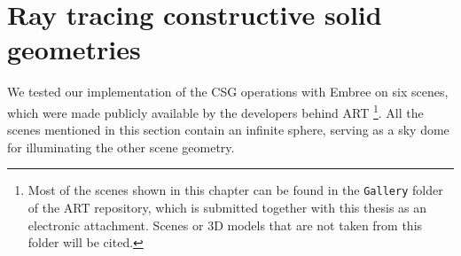 \section{Ray tracing constructive solid geometries}
\label{sec:results_csg}
We tested our implementation of the CSG operations with Embree on six scenes, which were made publicly available by the developers behind ART \footnote{Most of the scenes shown in this chapter can be found in the \texttt{Gallery} folder of the ART repository, which is submitted together with this thesis as an electronic attachment. Scenes or 3D models that are not taken from this folder will be cited.}. All the scenes mentioned in this section contain an infinite sphere, serving as a sky dome for illuminating the other scene geometry. 
\\

